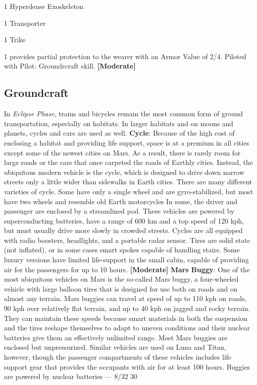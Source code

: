 1
Hyperdense 
Exoskeleton

1
Transporter

1
Trike

1
provides partial protection to the wearer with an 
Armor Value of 2/4. Piloted with Pilot: Groundrcraft 
skill. \textbf{[Moderate]}

\subsection{Groundcraft}

In \textit{Eclipse Phase,} trains and bicycles remain the most 
common form of ground transportation, especially on 
habitats. In larger habitats and on moons and planets, 
cycles and cars are used as well.
\textbf{Cycle}: Because of the high cost of enclosing a habitat
and providing life support, space is at a premium
in all cities except some of the newest cities on Mars. 
As a result, there is rarely room for large roads or the 
cars that once carpeted the roads of Earthly cities. 
Instead, the ubiquitous modern vehicle is the cycle, 
which is designed to drive down narrow streets only a 
little wider than sidewalks in Earth cities.
There are many different varieties of cycle. Some 
have only a single wheel and are gyro-stabilized, but 
most have two wheels and resemble old Earth motorcycles
In some, the driver and passenger are enclosed
by a streamlined pod. These vehicles are powered 
by superconducting batteries, have a range of 600 
km and a top speed of 120 kph, but must usually 
drive more slowly in crowded streets. Cycles are all 
equipped with radio boosters, headlights, and a portable
radar sensor. Tires are solid state (not inflated),
or in some cases smart spokes capable of handling 
stairs. Some luxury versions have limited life-support 
in the small cabin, capable of providing air for the 
passengers for up to 10 hours. \textbf{[Moderate]}
\textbf{Mars Buggy}: One of the most ubiquitous vehicles 
on Mars is the so-called Mars buggy, a four-wheeled 
vehicle with large balloon tires that is designed for 
use both on roads and on almost any terrain. Mars 
buggies can travel at speed of up to 110 kph on roads, 
90 kph over relatively flat terrain, and up to 40 kph 
on jagged and rocky terrain. They can maintain these 
speeds because smart materials in both the suspension 
and the tires reshape themselves to adapt to uneven 
conditions and their nuclear batteries give them an 
effectively unlimited range. Most Mars buggies are 
enclosed but unpressurized. Similar vehicles are used 
on Luna and Titan, however, though the passenger 
compartments of these vehicles includes life support 
gear that provides the occupants with air for at least 
100 hours. Buggies are powered by nuclear batteries 
—
8/32
30

